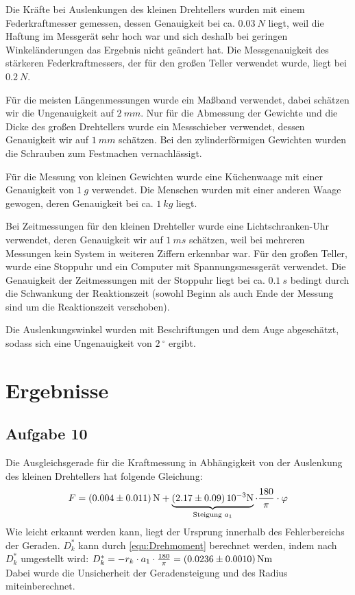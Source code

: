 \documentclass[a4paper,11pt,ngerman]{scrartcl}
\begin{document}
Die Kräfte bei Auslenkungen des kleinen Drehtellers wurden mit einem Federkraftmesser gemessen, dessen Genauigkeit bei ca. $\SI{0.03}{N}$ liegt, weil die Haftung im Messgerät sehr hoch war und sich deshalb bei geringen Winkeländerungen das Ergebnis nicht geändert hat. Die Messgenauigkeit des stärkeren Federkraftmessers, der für den großen Teller verwendet wurde, liegt bei $\SI{0.2}{N}$.

Für die meisten Längenmessungen wurde ein Maßband verwendet, dabei schätzen wir die Ungenauigkeit auf $\SI{2}{mm}$. Nur für die Abmessung der Gewichte und die Dicke des großen Drehtellers wurde ein Messschieber verwendet, dessen Genauigkeit wir auf $\SI{1}{mm}$ schätzen. Bei den zylinderförmigen Gewichten wurden die Schrauben zum Festmachen vernachlässigt.

Für die Messung von kleinen Gewichten wurde eine Küchenwaage mit einer Genauigkeit von $\SI{1}{g}$ verwendet. Die Menschen wurden mit einer anderen Waage gewogen, deren Genauigkeit bei ca. $\SI{1}{kg}$ liegt.

Bei Zeitmessungen für den kleinen Drehteller wurde eine Lichtschranken-Uhr verwendet, deren Genauigkeit wir auf $\SI{1}{ms}$ schätzen, weil bei mehreren Messungen kein System in weiteren Ziffern erkennbar war. Für den großen Teller, wurde eine Stoppuhr und ein Computer mit Spannungsmessgerät verwendet. Die Genauigkeit der Zeitmessungen mit der Stoppuhr liegt bei ca. $\SI{0.1}{s}$ bedingt durch die Schwankung der Reaktionszeit (sowohl Beginn als auch Ende der Messung sind um die Reaktionszeit verschoben).

Die Auslenkungswinkel wurden mit Beschriftungen und dem Auge abgeschätzt, sodass sich eine Ungenauigkeit von $\SI{2}{^\circ}$ ergibt.

\section{Ergebnisse}
\subsection{Aufgabe 10}

Die Ausgleichsgerade für die Kraftmessung in Abhängigkeit von der Auslenkung des kleinen Drehtellers hat folgende Gleichung:
\begin{equation}
F = \SI{0.004 \pm 0.011}{N} + \underbrace{\SI{2.17 \pm 0.09}{10^{-3}N}}_{\text{Steigung } a_1} \cdot \frac{180}{\pi} \cdot \varphi
\end{equation}
Wie leicht erkannt werden kann, liegt der Ursprung innerhalb des Fehlerbereichs der Geraden. $D^*_k$ kann durch \cref{equ:Drehmoment} berechnet werden, indem nach $D^*_k$ umgestellt wird: $D^*_k = -r_k \cdot a_1 \cdot \frac{180}{\pi} = \SI{0.0236 \pm 0.0010}{Nm}$\\
Dabei wurde die Unsicherheit der Geradensteigung und des Radius miteinberechnet.
\end{document}

